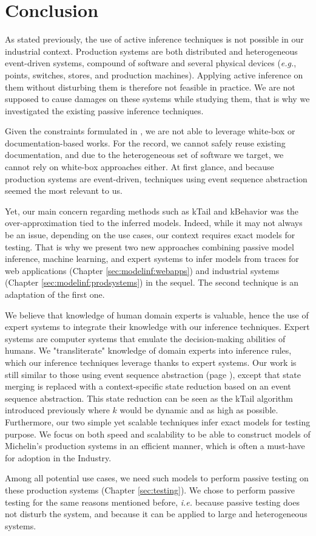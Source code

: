 \section{Conclusion}
\label{sec:related:conclusion}

As stated previously, the use of active inference techniques is
not possible in our industrial context. Production systems are
both distributed and heterogeneous event-driven systems, compound
of software and several physical devices (\emph{e.g.}, points,
switches, stores, and production machines). Applying active
inference on them without disturbing them is therefore not
feasible in practice. We are not supposed to cause damages on
these systems while studying them, that is why we investigated
the existing passive inference techniques.

Given the constraints formulated in
, we are not able to
leverage white-box or documentation-based works. For the record,
we cannot safely reuse existing documentation, and due to the
heterogeneous set of software we target, we cannot rely on
white-box approaches either. At first glance, and because
production systems are event-driven, techniques using event
sequence abstraction seemed the most relevant to us.

Yet, our main concern regarding methods such as kTail and
kBehavior was the over-approximation tied to the inferred models.
Indeed, while it may not always be an issue, depending on the use
cases, our context requires exact models for testing. That is why
we present two new approaches combining passive model inference,
machine learning, and expert systems to infer models from traces
for web applications (Chapter \ref{sec:modelinf:webapps}) and
industrial systems (Chapter \ref{sec:modelinf:prodsystems}) in
the sequel.  The second technique is an adaptation of the first
one.

We believe that knowledge of human domain experts is valuable,
hence the use of expert systems to integrate their knowledge with
our inference techniques. Expert systems are computer systems
that emulate the decision-making abilities of humans. We
"transliterate" knowledge of domain experts into inference rules,
which our inference techniques leverage thanks to expert systems.
Our work is still similar to those using event sequence
abstraction (page \pageref{sec:passive-fsa}), except that state
merging is replaced with a context-specific state reduction based
on an event sequence abstraction. This state reduction can be
seen as the kTail algorithm introduced previously where $k$ would
be dynamic and as high as possible.
Furthermore, our two simple yet scalable techniques infer exact
models for testing purpose. We focus on both speed and
scalability to be able to construct models of Michelin's
production systems in an efficient manner, which is often a
must-have for adoption in the Industry.

Among all potential use cases, we need such models to perform
passive testing on these production systems (Chapter
\ref{sec:testing}). We chose to perform passive testing for the
same reasons mentioned before, \emph{i.e.} because passive
testing does not disturb the system, and because it can be
applied to large and heterogeneous systems.

